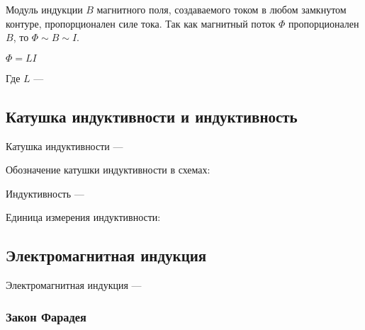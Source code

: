 Модуль индукции $B$ магнитного поля, создаваемого током в любом замкнутом контуре, пропорционален силе тока. Так как магнитный поток $\Phi$ пропорционален $B$, то 
$\Phi \sim B \sim I$.
\begin{center}
$\Phi = LI$
\end{center}

Где $L$  — \hrulefill

\hrulefill

\subsection{Катушка индуктивности и индуктивность}

Катушка индуктивности --- \hrulefill

\hrulefill

\hrulefill

Обозначение катушки индуктивности в схемах:


\newpage 

Индуктивность --- \hrulefill

\hrulefill

\hrulefill

Единица измерения индуктивности: 


\subsection{Электромагнитная индукция}

Электромагнитная индукция --- \hrulefill

\hrulefill

\hrulefill


\subsubsection{Закон Фарадея}

